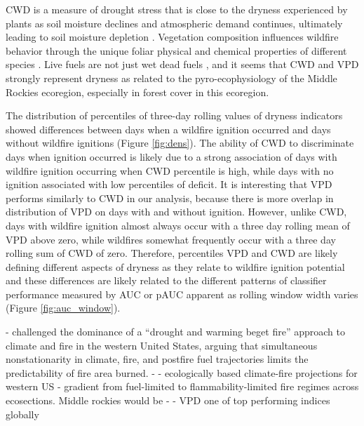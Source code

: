 \documentclass[11p]{article}
\begin{document}
CWD is a measure of drought stress that is close to the dryness experienced by plants as soil moisture declines and atmospheric demand continues, ultimately leading to soil moisture depletion \citep{stephensonActualEvapotranspirationDeficit1998}. Vegetation composition influences wildfire behavior through the unique foliar physical and chemical properties of different species \citep{mattjollySeasonalVariationsRed2016}. Live fuels are not just wet dead fuels \citep{jollyPyroEcophysiologyShiftingParadigm2018}, and it seems that CWD and VPD strongly represent dryness as related to the pyro-ecophysiology of the Middle Rockies ecoregion, especially in forest cover in this ecoregion.

The distribution of percentiles of three-day rolling values of dryness indicators showed differences between days when a wildfire ignition occurred and days without wildfire ignitions (Figure \ref{fig:dens}). The ability of CWD to discriminate days when ignition occurred is likely due to a strong association of days with wildfire ignition occurring when CWD percentile is high, while days with no ignition associated with low percentiles of deficit. It is interesting that VPD performs similarly to CWD in our analysis, because there is more overlap in distribution of VPD on days with and without ignition. However, unlike CWD, days with wildfire ignition almost always occur with a three day rolling mean of VPD above zero, while wildfires somewhat frequently occur with a three day rolling sum of CWD of zero. Therefore, percentiles VPD and CWD are likely defining different aspects of dryness as they relate to wildfire ignition potential and these differences are likely related to the different patterns of classifier performance measured by AUC or pAUC apparent as rolling window width varies (Figure \ref{fig:auc_window}).

- \citet{littellClimateChangeFuture2018} challenged the dominance of a “drought and warming beget fire” approach to climate and fire in the western United States, arguing that simultaneous nonstationarity in climate, fire, and postfire fuel trajectories limits the predictability of fire area burned.
- \citet{littellClimateChangeFuture2018} - ecologically based climate-fire projections for western US - gradient from fuel-limited to flammability-limited fire regimes across ecosections. Middle rockies would be
- \citet{zacharakisEnvironmentalForestFire2023} - VPD one of top performing indices globally

\end{document}
